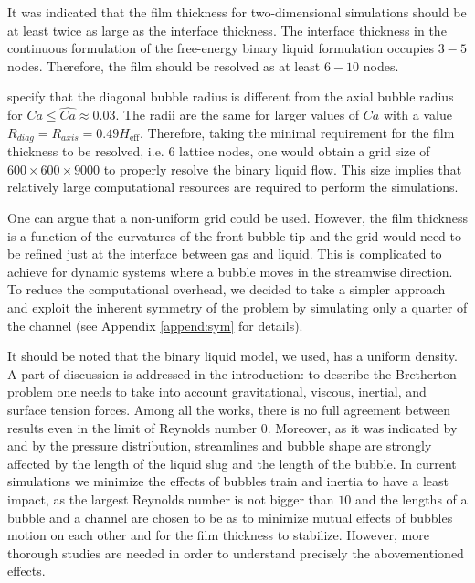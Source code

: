 \documentclass[preprint,12pt]{elsarticle}
\begin{document}
It was indicated \cite{kuzmin-binary2d} that the film thickness for two-dimensional simulations should be at least twice as large
as the interface thickness. The interface thickness in the continuous formulation of the
free-energy binary liquid formulation occupies $3-5$ nodes. Therefore, the film should be
resolved as at least $6-10$ nodes. 

\citet{heil-threedim} specify that the diagonal bubble radius is different from the
axial bubble radius for $Ca\leq \widehat{Ca}\approx 0.03$. The radii are the same for larger values
of
$Ca$ with a value $R_{diag}=R_{axis}=0.49 H_{\mathrm{eff}}$. Therefore, taking the minimal
requirement for the film thickness to be
resolved, i.e. $6$ lattice nodes, one would obtain a grid size of $600\times 600 \times 9000 $ to
properly resolve the binary liquid flow. This size implies that relatively
large
computational resources are required to perform the simulations.

One can argue that a non-uniform grid could be used. However, the film thickness is a
function of the curvatures of the front bubble tip \cite{bretherton} and the grid would need to
be refined just at the interface between gas and liquid. This is complicated to achieve for
dynamic systems where a bubble moves in the streamwise direction.
To reduce the computational overhead, we decided to take a simpler approach and exploit the
inherent symmetry of the problem by simulating only a quarter of the channel (see Appendix
\ref{append:sym} for details).

It should be noted that the binary liquid model, we used, has a uniform density. A part of
discussion is
addressed in the introduction:  to describe the Bretherton problem one needs to take into
account gravitational, viscous, inertial, and surface tension forces. Among all the works, there
is no full 
agreement between results even in the limit of Reynolds number $0$.  Moreover, as it was indicated
by \citet{kreutzer-taylor} and by \citet{cerro-bubble-train} the pressure distribution, streamlines
and bubble shape are strongly affected by the length of the liquid slug and the length of the
bubble. In current simulations we minimize the effects of bubbles train and inertia to have a least
impact, as the largest Reynolds number is not bigger than $10$ and the lengths of a bubble and a
channel are chosen to be as to minimize mutual effects of bubbles motion on each other and for the
film thickness to stabilize. However, more thorough studies are needed in order to understand
precisely the abovementioned effects.
\end{document}
